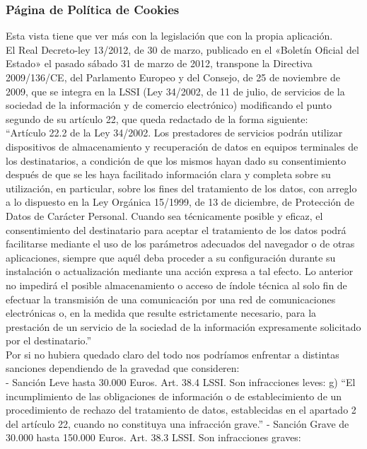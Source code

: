 \subsubsection{Página de Política de Cookies}
\label{subsubsec:cookies}
Esta vista tiene que ver más con la legislación que con la propia aplicación.\\
El Real Decreto-ley 13/2012, de 30 de marzo, publicado en el «Boletín Oficial del Estado» el pasado sábado 31 de marzo de 2012, transpone la Directiva 2009/136/CE, del Parlamento Europeo y del Consejo, de 25 de noviembre de 2009, que se integra en la LSSI (Ley 34/2002, de 11 de julio, de servicios de la sociedad de la información y de comercio electrónico) modificando el punto segundo de su artículo 22, que queda redactado de la forma siguiente:\\
``Artículo 22.2 de la Ley 34/2002. Los prestadores de servicios podrán utilizar dispositivos de almacenamiento y recuperación de datos en equipos terminales de los destinatarios, a condición de que los mismos hayan dado su consentimiento después de que se les haya facilitado información clara y completa sobre su utilización, en particular, sobre los fines del tratamiento de los datos, con arreglo a lo dispuesto en la Ley Orgánica 15/1999, de 13 de diciembre, de Protección de Datos de Carácter Personal. Cuando sea técnicamente posible y eficaz, el consentimiento del destinatario para aceptar el tratamiento de los datos podrá facilitarse mediante el uso de los parámetros adecuados del navegador o de otras aplicaciones, siempre que aquél deba proceder a su configuración durante su instalación o actualización mediante una acción expresa a tal efecto. Lo anterior no impedirá el posible almacenamiento o acceso de índole técnica al solo fin de efectuar la transmisión de una comunicación por una red de comunicaciones electrónicas o, en la medida que resulte estrictamente necesario, para la prestación de un servicio de la sociedad de la información expresamente solicitado por el destinatario.''\\
Por si no hubiera quedado claro del todo nos podríamos enfrentar a distintas sanciones dependiendo de la gravedad que consideren:\\
- Sanción Leve hasta 30.000 Euros.  Art. 38.4 LSSI. Son infracciones leves:
g) ``El incumplimiento de las obligaciones de información o de establecimiento de un procedimiento de rechazo del tratamiento de datos, establecidas en el apartado 2 del artículo 22, cuando no constituya una infracción grave.''
- Sanción Grave de 30.000 hasta 150.000 Euros. Art. 38.3 LSSI. Son infracciones graves:
